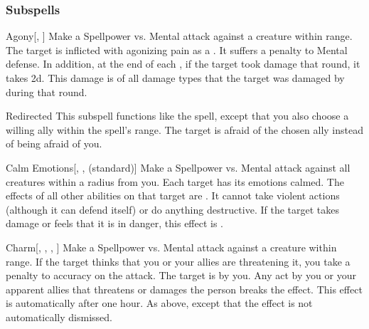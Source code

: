 \subsubsection{Subspells}


\begin{ability}[\nth{1}]{Agony}[, ]
Make a Spellpower vs. Mental attack against a creature within \rngmed range.
\hit The target is inflicted with agonizing pain as a .
It suffers a  penalty to Mental defense.
In addition, at the end of each , if the target took damage that round, it takes  \minus2d.
This damage is of all damage types that the target was damaged by during that round.
\end{ability}
\vspace{0.25em}


\begin{ability}[\nth{2}]{Redirected}
This subspell functions like the  spell, except that you also choose a willing ally within the spell's range.
The target is afraid of the chosen ally instead of being afraid of you.
\end{ability}
\vspace{0.25em}


\begin{ability}[\nth{3}]{Calm Emotions}[, ,  (standard)]
Make a Spellpower vs. Mental attack against all creatures within a \areamed radius from you.
\hit Each target has its emotions calmed.
The effects of all other  abilities on that target are .
It cannot take violent actions (although it can defend itself) or do anything destructive.
If the target takes damage or feels that it is in danger, this effect is .
\end{ability}
\vspace{0.25em}


\begin{ability}[\nth{3}]{Charm}[, , , ]
Make a Spellpower vs. Mental attack against a creature within \rngmed range.
If the target thinks that you or your allies are threatening it, you take a  penalty to accuracy on the attack.
\hit The target is \charmed by you.
Any act by you or your apparent allies that threatens or damages the  person breaks the effect.
This effect is automatically  after one hour.
\crit As above, except that the effect is not automatically dismissed.
\end{ability}
\vspace{0.25em}


